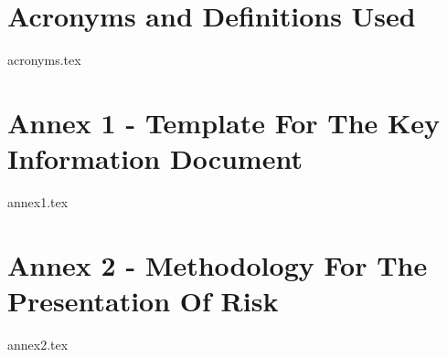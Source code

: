 \documentclass{report}
\begin{document}
	
\tableofcontents

\part{Acronyms and Definitions Used}
{acronyms.tex}
\pagebreak

\part{Annex 1 - 
\textbf{\color{blue}Template For The Key Information Document}
}

{annex1.tex}
\pagebreak

\part{Annex 2 - 
\textbf{\color{blue}Methodology For The Presentation Of Risk}
}

{annex2.tex}
\pagebreak
\end{document}
